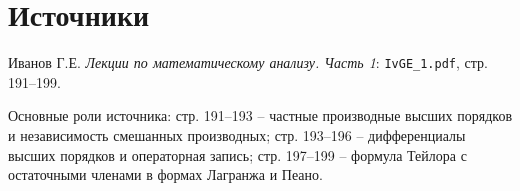 \documentclass[12pt,a4paper]{article}
\begin{document}
\section*{Источники}

Иванов Г.Е. \emph{Лекции по математическому анализу. Часть 1}:
\texttt{IvGE\_1.pdf}, стр. 191--199.

Основные роли источника: стр. 191--193 -- частные производные высших
порядков и независимость смешанных производных; стр. 193--196 --
дифференциалы высших порядков и операторная запись; стр. 197--199 --
формула Тейлора с остаточными членами в формах Лагранжа и Пеано.
\end{document}
